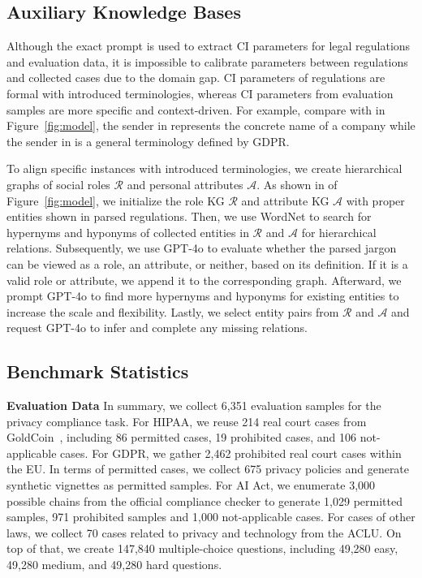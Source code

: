 \subsection{Auxiliary Knowledge Bases}
\label{sec: Auxiliary Knowledge Bases}
Although the exact prompt is used to extract CI parameters for legal regulations and evaluation data, it is impossible to calibrate parameters between regulations and collected cases due to the domain gap.
CI parameters of regulations are formal with introduced terminologies, whereas CI parameters from evaluation samples are more specific and context-driven. 
For example, compare  with  in Figure~\ref{fig:model}, the sender in  represents the concrete name of a company while the sender in  is a general terminology defined by GDPR.

To align specific instances with introduced terminologies, we create hierarchical graphs of social roles $\mathcal{R}$ and personal attributes $\mathcal{A}$.
As shown in  of Figure~\ref{fig:model}, we initialize the role KG $\mathcal{R}$ and attribute KG $\mathcal{A}$ with proper entities shown in parsed regulations.
Then, we use WordNet to search for hypernyms and hyponyms of collected entities in $\mathcal{R}$ and $\mathcal{A}$ for hierarchical relations.
Subsequently, we use GPT-4o to evaluate whether the parsed jargon can be viewed as a role, an attribute, or neither, based on its definition.
If it is a valid role or attribute, we append it to the corresponding graph.
Afterward, we prompt GPT-4o to find more hypernyms and hyponyms for existing entities to increase the scale and flexibility.
Lastly, we select entity pairs from $\mathcal{R}$ and $\mathcal{A}$ and request  GPT-4o to infer and complete any missing relations.









\subsection{Benchmark Statistics}

\textbf{Evaluation Data} In summary, we collect 6,351 evaluation samples for the privacy compliance task.
For HIPAA, we reuse 214 real court cases from GoldCoin~\cite{fan2024goldcoin}, including 86 permitted cases, 19 prohibited cases, and 106 not-applicable cases.
For GDPR, we gather 2,462 prohibited real court cases within the EU.
In terms of permitted cases, we collect 675 privacy policies and generate synthetic vignettes as permitted samples.
For AI Act, we enumerate 3,000 possible chains from the official compliance checker to generate 1,029 permitted samples, 971 prohibited samples and 1,000 not-applicable cases.
For cases of other laws, we collect 70 cases related to privacy and technology from the ACLU.
On top of that, we create 147,840 multiple-choice questions, including 49,280 easy, 49,280 medium, and 49,280 hard questions.


